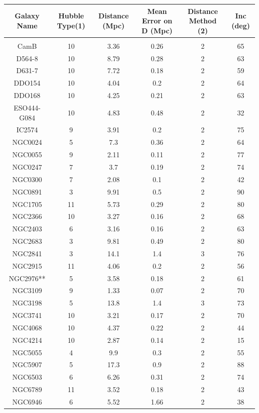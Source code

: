 \documentclass[reprint,%
 amsmath,amssymb,
 aps,
]{revtex4-1}
\begin{document}
  
  \begin{table}[]
      \centering
      \begin{tabular}{|c|c|c|c|c|c|}
      \hline \hline
Galaxy Name & Hubble Type(1)& 	Distance (Mpc)&Mean Error on D (Mpc)& 	Distance Method (2)& 	Inc (deg)\\
    \hline \hline\\
CamB&   	10&    3.36&  	0.26&   2&  65\\
D564-8& 	10& 	8.79& 	0.28& 	2& 	63\\
D631-7& 	10& 	7.72& 	0.18& 	2& 	59\\
DDO154& 	10& 	4.04& 	0.2& 	2& 	64\\
DDO168& 	10& 	4.25& 	0.21& 	2& 	63\\
ESO444-G084& 10& 	4.83& 	0.48& 	2& 	32\\
IC2574& 	9& 	3.91& 	0.2&    	2& 	75\\
NGC0024& 	5& 	7.3& 	0.36&   	2& 	64\\
NGC0055& 	9& 	2.11& 	0.11&   	2& 	77\\
NGC0247& 	7& 	3.7& 	0.19&   	2& 	74\\
NGC0300& 	7& 	2.08& 	0.1&    	2& 	42\\
NGC0891& 	3& 	9.91& 	0.5&    	2& 	90\\
NGC1705& 	11& 	5.73& 	0.29& 	2& 	80\\
NGC2366& 	10& 	3.27& 	0.16& 	2& 	68\\
NGC2403& 	6& 	3.16& 	0.16&   	2& 	63\\
NGC2683& 	3& 	9.81& 	0.49&   	2& 	80\\
NGC2841& 	3& 	14.1& 	1.4&    	3& 	76\\
NGC2915& 	11& 	4.06& 	0.2& 	2& 	56\\
NGC2976**& 	5& 	3.58& 	0.18&   	2& 	61\\
NGC3109& 	9& 	1.33& 	0.07&   	2& 	70\\
NGC3198& 	5& 	13.8& 	1.4&    	3& 	73\\
NGC3741& 	10& 	3.21& 	0.17& 	2& 	70\\
NGC4068& 	10& 	4.37& 	0.22& 	2& 	44\\
NGC4214& 	10& 	2.87& 	0.14& 	2& 	15\\
NGC5055& 	4& 	9.9& 	0.3&    	2& 	55\\
NGC5907& 	5& 	17.3& 	0.9&    	2& 	88\\
NGC6503& 	6& 	6.26& 	0.31&   	2& 	74\\
NGC6789& 	11& 	3.52& 	0.18& 	2& 	43\\
NGC6946& 	6& 	5.52& 	1.66&   	2& 	38\\

\end{tabular}
\end{table}
\end{document}
